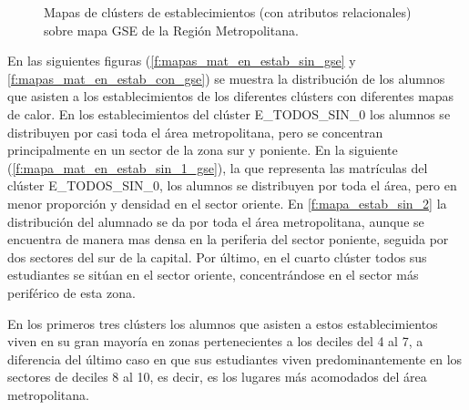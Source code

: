 \begin{figure}[H]
 \caption{Mapas de clústers de establecimientos (con atributos relacionales) sobre mapa GSE de la Región Metropolitana.}
 \label{f:mapas_estab_con_gse}
\end{figure}

En las siguientes figuras (\ref{f:mapas_mat_en_estab_sin_gse} y \ref{f:mapas_mat_en_estab_con_gse}) se muestra la distribución de los alumnos que asisten a los establecimientos de los diferentes clústers con diferentes mapas de calor. En los establecimientos del clúster E\_TODOS\_SIN\_0 los alumnos se distribuyen por casi toda el área metropolitana, pero se concentran principalmente en un sector de la zona sur y poniente. En la siguiente (\ref{f:mapa_mat_en_estab_sin_1_gse}), la que representa las matrículas del clúster E\_TODOS\_SIN\_0, los alumnos se distribuyen por toda el área, pero en menor proporción y densidad en el sector oriente. En \ref{f:mapa_estab_sin_2} la distribución del alumnado se da por toda el área metropolitana, aunque se encuentra de manera mas densa en la periferia del sector poniente, seguida por dos sectores del sur de la capital. Por último, en el cuarto clúster todos sus estudiantes se sitúan en el sector oriente, concentrándose en el sector más periférico de esta zona. 

En los primeros tres clústers los alumnos que asisten a estos establecimientos viven en su gran mayoría en zonas pertenecientes a los deciles del 4 al 7, a diferencia del último caso en que sus estudiantes viven predominantemente en los sectores de deciles 8 al 10, es decir, es los lugares más acomodados del área metropolitana.


